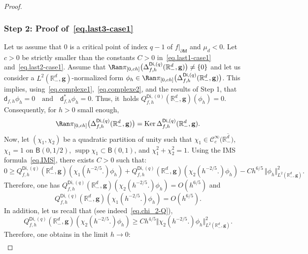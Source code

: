 \documentclass[10pt]{amsart}
\newcommand{\quand}{\quad\text{and}\quad}
\newcommand{\mbf}[1]{\mathbf{#1}}
\let\pa\partial
\DeclareMathOperator\Ker{Ker}
\DeclareMathOperator\supp{supp}
\theoremstyle{plain}
\theoremstyle{definition}
\begin{document}
\begin{proof}
\subsubsection*{Step 2: Proof of~\eqref{eq.last3-case1}}
Let us assume that $0$ is a critical point of index $q-1$ of
$f|_{\pa \mathsf M}$ and $\mu_{d}<0$. Let $c>0$ be strictly
smaller than the constants $C>0$ in~\eqref{eq.last1-case1}
and~\eqref{eq.last2-case1}. Assume that $\Ran \pi_{[0,ch]}\bigl(\Delta_{f,h}^{\mathsf{Di},(q)}(\mathbb R_-^d, \mbf g) \bigr)\neq
\{0\}$ and let us consider a $L^2(\mathbb R_-^d, \mbf g) $-normalized form $\phi_h\in \Ran \pi_{[0,ch]}\bigl(\Delta_{f,h}^{\mathsf{Di},(q)}(\mathbb R_-^d, \mbf g) \bigr)$. This implies, using~\eqref{eq.complexe1},~\eqref{eq.complexe2}, and the results of {Step 1}, that
$\mathsf d_{f,h}\phi_h= 0 \quand \mathsf d_{f,h}^*\phi_h=0$.
Thus, it~holds $ Q_{f,h}^{\mathsf{Di},(0)}(\mathbb R^d_-,\mbf g)(\phi_h)=0$.
Consequently, for $h>0$ small enough,
\[
\Ran \pi_{[0,ch]}\bigl(\Delta_{f,h}^{\mathsf{Di},(q)}(\mathbb R^d_-,\mbf g)\bigr)=\Ker \Delta_{f,h}^{\mathsf{Di},(q)}(\mathbb R^d_-,\mbf g).
\]
Now, let $(\chi_1,\chi_2)$ be a quadratic partition of unity such that $\chi_1\in \mathcal C_c^\infty (\overline {\mathbb R_-^d)}$, $\chi_1=1$ on $\mathsf B(0,1/2)$, $\supp \chi_1\subset \mathsf B(0,1)$, and $\chi_1^2+\chi_2^2=1$.
Using the IMS formula~\eqref{eq.IMS}, there exists $C>0$ such that:\vspace*{-3pt}
\[
0 \!\ge\! Q_{f,h}^{\mathsf{Di},(q)}(\mathbb R^d_-,\mbf g)
(\chi_1(h^{-2/5 }.) \phi_h)+Q_{f,h}^{\mathsf{Di},(q)}(\mathbb R^d_-,\mbf g)(\chi_2(h^{-2/5 }.) \phi_h)
-C h^{6/5}\, \big \Vert
\phi_h\big \Vert_{L^2(\mathbb R^d_-,\mbf g)}^2.
\]
Therefore, one has $Q_{f,h}^{\mathsf{Di},(q)}(\mathbb R^d_-,\mbf g)(\chi_2(h^{-2/5 }.) \phi_h) =O(h^{6/5})$ and\vspace*{-3pt}
\begin{equation}\label{quad-chi1-b}
Q_{f,h}^{\mathsf{Di},(q)}(\mathbb R^d_-,\mbf g) (\chi_1(h^{-2/5 }.)\phi_h)= O (h^{6/5}).
\end{equation}
In addition, let us recall that (see indeed~\eqref{eq.chi_2-Q}),\vspace*{-3pt}
\[
Q_{f,h}^{\mathsf{Di},(q)}(\mathbb R^d_-,\mbf g)(\chi_2(h^{-2/5 }.) \phi_h)\ge Ch^{4/5} \big \Vert \chi_2(h^{-2/5 }.) \phi_h\big \Vert_{L^2(\mathbb R^d_-,\mbf g)}^2.
\]
Therefore, one obtains in the limit $h\to 0$:\vspace*{-3pt}
\begin{equation}\label{norme-chi-b}
\begin{aligned}

\end{aligned}
\end{equation}
\end{proof}
\end{document}
